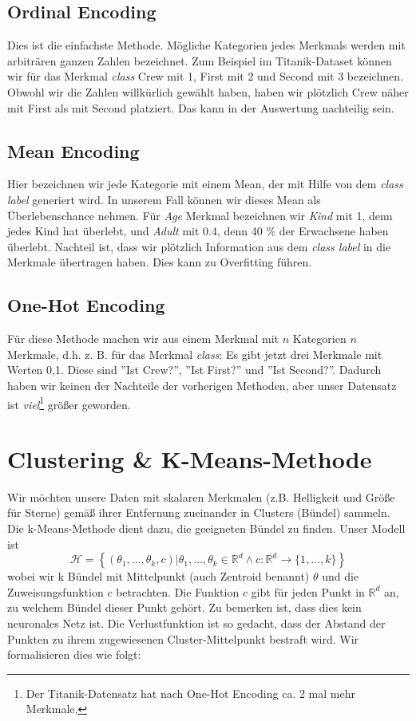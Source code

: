 \subsection{Ordinal Encoding}
Dies ist die einfachste Methode. Mögliche Kategorien jedes Merkmals werden mit arbiträren ganzen Zahlen bezeichnet. Zum Beispiel im Titanik-Dataset können wir für das Merkmal \textit{class} Crew mit 1, First mit 2 und Second mit 3 bezeichnen. Obwohl wir die Zahlen willkürlich gewählt haben, haben wir plötzlich Crew näher mit First als mit Second platziert. Das kann  in der Auswertung nachteilig sein.

\subsection{Mean Encoding}
Hier bezeichnen wir jede Kategorie mit einem Mean, der mit Hilfe von dem \textit{class label} generiert wird. In unserem Fall können wir dieses Mean als Überlebenschance nehmen. Für \textit{Age} Merkmal bezeichnen wir \textit{Kind} mit 1, denn jedes Kind hat überlebt, und \textit{Adult} mit 0.4, denn 40 \% der Erwachsene haben überlebt. Nachteil ist, dass wir plötzlich Information aus dem \textit{class label} in die Merkmale übertragen haben. Dies kann zu Overfitting führen.

\subsection{One-Hot Encoding}
Für diese Methode machen wir aus einem Merkmal mit $n$ Kategorien $n$ Merkmale, d.h. z. B. für das Merkmal \textit{class}: Es gibt jetzt drei Merkmale mit Werten {0,1}. Diese sind ''Ist Crew?'', ''Ist First?'' und ''Ist Second?''. Dadurch haben wir keinen der Nachteile der vorherigen Methoden, aber unser Datensatz ist \textit{viel}\footnote{Der Titanik-Datensatz hat nach One-Hot Encoding ca. 2 mal mehr Merkmale.} größer geworden. 


\section{Clustering \& K-Means-Methode}
Wir möchten unsere Daten mit skalaren Merkmalen (z.B. Helligkeit und Größe für Sterne) gemäß ihrer Entfernung zueinander in Clusters (Bündel) sammeln. Die k-Means-Methode dient dazu, die geeigneten Bündel zu finden. Unser Modell ist
\begin{equation}
     \mathcal{H} = \left\{ (\theta_1,...,\theta_k,c) | \theta_1,...,\theta_k \in \mathbb{R}^d \land c : \mathbb{R}^d \to \{1,...,k\} \right\}
\end{equation}
wobei wir k Bündel mit Mittelpunkt (auch Zentroid benannt) $\theta$ und die Zuweisungsfunktion $c$ betrachten. Die Funktion $c$ gibt für jeden Punkt in $\mathbb{R}^d$ an, zu welchem Bündel dieser Punkt gehört. Zu bemerken ist, dass dies kein neuronales Netz ist. Die Verlustfunktion ist so gedacht, dass der Abstand der Punkten zu ihrem zugewiesenen Cluster-Mittelpunkt bestraft wird. Wir formalisieren dies wie folgt:\\

